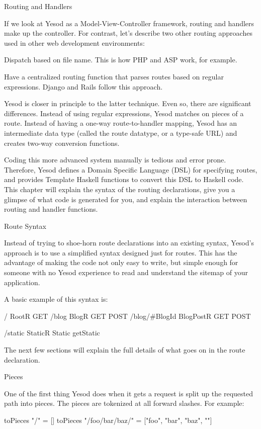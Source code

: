 Routing and Handlers

If we look at Yesod as a Model-View-Controller framework, routing and
handlers make up the controller. For contrast, let's describe two
other routing approaches used in other web development environments:

Dispatch based on file name. This is how PHP and ASP work, for example.

Have a centralized routing function that parses routes based on
regular expressions. Django and Rails follow this approach.

Yesod is closer in principle to the latter technique. Even so, there
are significant differences. Instead of using regular expressions,
Yesod matches on pieces of a route. Instead of having a one-way
route-to-handler mapping, Yesod has an intermediate data type (called
the route datatype, or a type-safe URL) and creates two-way conversion
functions.

Coding this more advanced system manually is tedious and error
prone. Therefore, Yesod defines a Domain Specific Language (DSL) for
specifying routes, and provides Template Haskell functions to convert
this DSL to Haskell code. This chapter will explain the syntax of the
routing declarations, give you a glimpse of what code is generated for
you, and explain the interaction between routing and handler
functions.

Route Syntax

Instead of trying to shoe-horn route declarations into an existing
syntax, Yesod's approach is to use a simplified syntax designed just
for routes. This has the advantage of making the code not only easy to
write, but simple enough for someone with no Yesod experience to read
and understand the sitemap of your application.

A basic example of this syntax is:

/             RootR     GET
/blog         BlogR     GET POST
/blog/#BlogId BlogPostR GET POST

/static       StaticR   Static getStatic

The next few sections will explain the full details of what goes on in
the route declaration.

Pieces

One of the first thing Yesod does when it gets a request is split up
the requested path into pieces. The pieces are tokenized at all
forward slashes. For example:

toPieces "/" = []
toPieces "/foo/bar/baz/" = ["foo", "bar", "baz", ""]

